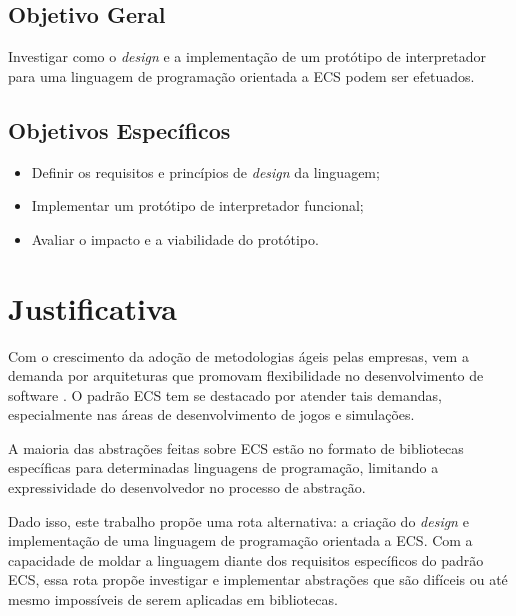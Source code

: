 \subsection{Objetivo Geral}

Investigar como o \textit{design} e a implementação de um protótipo de interpretador para uma linguagem de programação orientada a ECS podem ser efetuados.

\subsection{Objetivos Específicos}

\begin{itemize}
    \item Definir os requisitos e princípios de \textit{design} da linguagem;
    \item Implementar um protótipo de interpretador funcional;
    \item Avaliar o impacto e a viabilidade do protótipo.
\end{itemize}

\section{Justificativa}

Com o crescimento da adoção de metodologias ágeis pelas empresas, vem a demanda por arquiteturas que promovam flexibilidade no desenvolvimento de software \cite{flightdynamics}. O padrão ECS tem se destacado por atender tais demandas, especialmente nas áreas de desenvolvimento de jogos e simulações.

A maioria das abstrações feitas sobre ECS estão no formato de bibliotecas específicas para determinadas linguagens de programação, limitando a expressividade do desenvolvedor no processo de abstração.

Dado isso, este trabalho propõe uma rota alternativa: a criação do \textit{design} e implementação de uma linguagem de programação orientada a ECS. Com a capacidade de moldar a linguagem diante dos requisitos específicos do padrão ECS, essa rota propõe investigar e implementar abstrações que são difíceis ou até mesmo impossíveis de serem aplicadas em bibliotecas.
